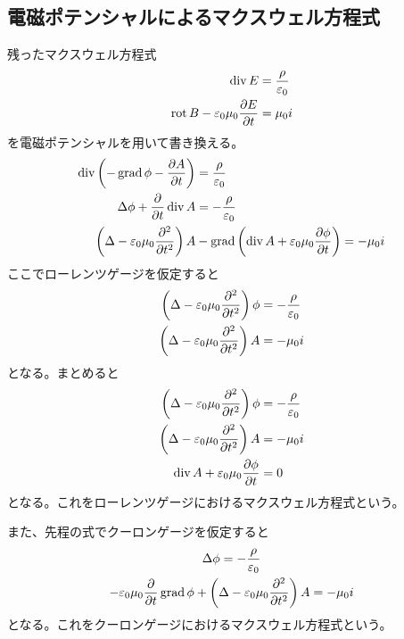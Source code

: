 \subsection{電磁ポテンシャルによるマクスウェル方程式}
    残ったマクスウェル方程式
    \begin{align*}
        \div E &= \frac{\rho}{\epsilon_0}\\
        \rot B - \epsilon_0\mu_0\pd[E]{t} &= \mu_0 i
    \end{align*}
    を電磁ポテンシャルを用いて書き換える。
    \begin{align*}
        \div \left(-\grad\phi - \pd[A]{t}\right) &= \frac{\rho}{\epsilon_0}\\
        \Delta \phi + \pd{t}\div A &= -\frac{\rho}{\epsilon_0}\\
        \left(\Delta - \epsilon_0\mu_0\pd[^2]{t^2}\right)A &- \grad\left(\div A + \epsilon_0\mu_0\pd[\phi]{t}\right) = -\mu_0 i
    \end{align*}
    ここでローレンツゲージを仮定すると
    \begin{align*}
        \left(\Delta-\epsilon_0\mu_0\pd[^2]{t^2}\right)\phi &= -\frac{\rho}{\epsilon_0}\\
        \left(\Delta-\epsilon_0\mu_0\pd[^2]{t^2}\right)A &= -\mu_0 i
    \end{align*}
    となる。まとめると
    \begin{align*}
        \left(\Delta-\epsilon_0\mu_0\pd[^2]{t^2}\right)\phi &= -\frac{\rho}{\epsilon_0}\\
        \left(\Delta-\epsilon_0\mu_0\pd[^2]{t^2}\right)A &= -\mu_0 i\\
        \div A + \epsilon_0\mu_0\pd[\phi]{t} &= 0
    \end{align*}
    となる。これをローレンツゲージにおけるマクスウェル方程式という。

    また、先程の式でクーロンゲージを仮定すると
    \begin{gather*}
        \Delta \phi = -\frac{\rho}{\epsilon_0}\\
        -\epsilon_0\mu_0\pd{t}\grad\phi + \left(\Delta - \epsilon_0\mu_0\pd[^2]{t^2}\right)A = -\mu_0 i
    \end{gather*}
    となる。これをクーロンゲージにおけるマクスウェル方程式という。

